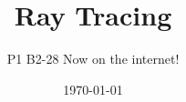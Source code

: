 \documentclass[32pt,oneside,a4paper,titlepage]{article}
\title{Ray Tracing}
\author{P1 B2-28 Now on the internet!}
\date{\today}
\begin{document}
\maketitle

\renewcommand{\abstractname}{Abstrakt}
\begin{abstract}

\end{abstract}

\tableofcontents
\clearpage






\renewcommand\refname{Bibliografi}
\begin{thebibliography}{99}



\end{thebibliography}
\end{document}
